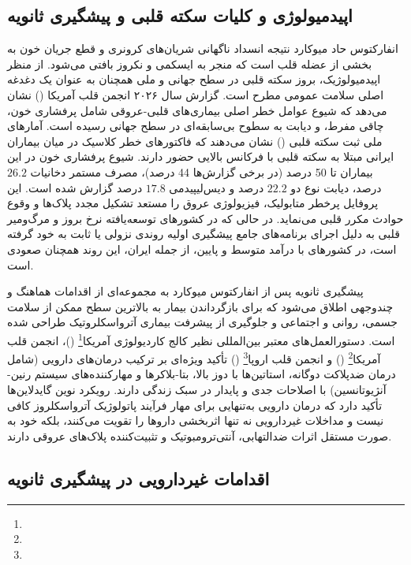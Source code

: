 \subsection{ اپیدمیولوژی و کلیات سکته قلبی و پیشگیری ثانویه}


انفارکتوس حاد میوکارد نتیجه انسداد ناگهانی شریان‌های کرونری و قطع جریان خون به بخشی از عضله قلب است که منجر به ایسکمی و نکروز بافتی می‌شود\cite{Byrne2023ESC,Virani2023ChronicCoronary}. از منظر اپیدمیولوژیک، بروز سکته قلبی در سطح جهانی و ملی همچنان به عنوان یک دغدغه اصلی سلامت عمومی مطرح است. گزارش سال ۲۰۲۶ انجمن قلب آمریکا () نشان می‌دهد که شیوع عوامل خطر اصلی بیماری‌های قلبی-عروقی شامل پرفشاری خون، چاقی مفرط، و دیابت به سطوح بی‌سابقه‌ای در سطح جهانی رسیده است\cite{Palaniappan2026HeartStats}. آمارهای ملی ثبت سکته قلبی () نشان می‌دهند که فاکتورهای خطر کلاسیک در میان بیماران ایرانی مبتلا به سکته قلبی با فرکانس بالایی حضور دارند. شیوع پرفشاری خون در این بیماران تا 50 درصد (در برخی گزارش‌ها 44 درصد)، مصرف مستمر دخانیات $26.2$ درصد، دیابت نوع دو $22.2$ درصد و دیس‌لیپیدمی $17.8$ درصد گزارش شده است\cite{Beyranvand2023IranMI}. این پروفایل پرخطر متابولیک، فیزیولوژی عروق را مستعد تشکیل مجدد پلاک‌ها و وقوع حوادث مکرر قلبی می‌نماید. در حالی که در کشورهای توسعه‌یافته نرخ بروز و مرگ‌ومیر قلبی به دلیل اجرای برنامه‌های جامع پیشگیری اولیه روندی نزولی یا ثابت به خود گرفته است، در کشورهای با درآمد متوسط و پایین، از جمله ایران، این روند همچنان صعودی است\cite{WHO2014NCD,Beyranvand2023IranMI}.

پیشگیری ثانویه پس از انفارکتوس میوکارد به مجموعه‌ای از اقدامات هماهنگ و چندوجهی اطلاق می‌شود که برای بازگرداندن بیمار به بالاترین سطح ممکن از سلامت جسمی، روانی و اجتماعی و جلوگیری از پیشرفت بیماری آترواسکلروتیک طراحی شده است. دستورالعمل‌های معتبر بین‌المللی نظیر کالج کاردیولوژی آمریکا\footnote{} ()، انجمن قلب آمریکا\footnote{} () و انجمن قلب اروپا\footnote{} () تأکید ویژه‌ای بر ترکیب درمان‌های دارویی (شامل درمان ضدپلاکت دوگانه، استاتین‌ها با دوز بالا، بتا-بلاکرها و مهارکننده‌های سیستم رنین-آنژیوتانسین) با اصلاحات جدی و پایدار در سبک زندگی دارند\cite{Byrne2023ESC,Virani2023ChronicCoronary}. رویکرد نوین گایدلاین‌ها تأکید دارد که درمان دارویی به‌تنهایی برای مهار فرآیند پاتولوژیک آترواسکلروز کافی نیست و مداخلات غیردارویی نه تنها اثربخشی داروها را تقویت می‌کنند، بلکه خود به صورت مستقل اثرات ضدالتهابی، آنتی‌ترومبوتیک و تثبیت‌کننده پلاک‌های عروقی دارند\cite{Byrne2023ESC,Keenan2017Adherence}.


\subsection{اقدامات غیردارویی در پیشگیری ثانویه}


